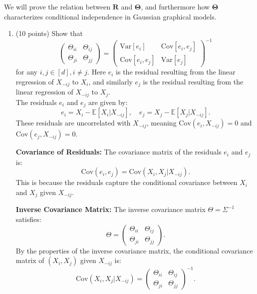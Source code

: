 \documentclass[a3paper,12pt]{extarticle} %
\begin{document}
We will prove the relation between \( \mathbf{R} \) and \( \boldsymbol{\Theta} \), and furthermore how \( \boldsymbol{\Theta} \) characterizes conditional independence in Gaussian graphical models.

\begin{enumerate}
    \item (10 points) Show that
    \[
    \begin{pmatrix}
    \Theta_{ii} & \Theta_{ij} \\
    \Theta_{ji} & \Theta_{jj}
    \end{pmatrix}
    =
    \begin{pmatrix}
    \text{Var}[e_i] & \text{Cov}[e_i, e_j] \\
    \text{Cov}[e_i, e_j] & \text{Var}[e_j]
    \end{pmatrix}^{-1}
    \]
    for any \(i, j \in [d], i \neq j\). Here \(e_i\) is the residual resulting from the linear regression of \(X_{-ij}\) to \(X_i\), and similarly \(e_j\) is the residual resulting from the linear regression of \(X_{-ij}\) to \(X_j\).
    \\ The residuals \( e_i \) and \( e_j \) are given by:
   \[
   e_i = X_i - \mathbb{E}[X_i | X_{-ij}], \quad e_j = X_j - \mathbb{E}[X_j | X_{-ij}].
   \]
   These residuals are uncorrelated with \( X_{-ij} \), meaning \( \text{Cov}(e_i, X_{-ij}) = 0 \) and \( \text{Cov}(e_j, X_{-ij}) = 0 \).

\textbf{Covariance of Residuals:}
   The covariance matrix of the residuals \( e_i \) and \( e_j \) is:
   \[
   \text{Cov}(e_i, e_j) = \text{Cov}(X_i, X_j | X_{-ij}).
   \]
   This is because the residuals capture the conditional covariance between \( X_i \) and \( X_j \) given \( X_{-ij} \).

\textbf{Inverse Covariance Matrix:}
   The inverse covariance matrix \( \Theta = \Sigma^{-1} \) satisfies:
   \[
   \Theta = \begin{pmatrix}
   \Theta_{ii} & \Theta_{ij} \\
   \Theta_{ji} & \Theta_{jj}
   \end{pmatrix}.
   \]
   By the properties of the inverse covariance matrix, the conditional covariance matrix of \( (X_i, X_j) \) given \( X_{-ij} \) is:
   \[
   \text{Cov}(X_i, X_j | X_{-ij}) = \begin{pmatrix}
   \Theta_{ii} & \Theta_{ij} \\
   \Theta_{ji} & \Theta_{jj}
   \end{pmatrix}^{-1}.
   \]


\end{enumerate}
\end{document}

